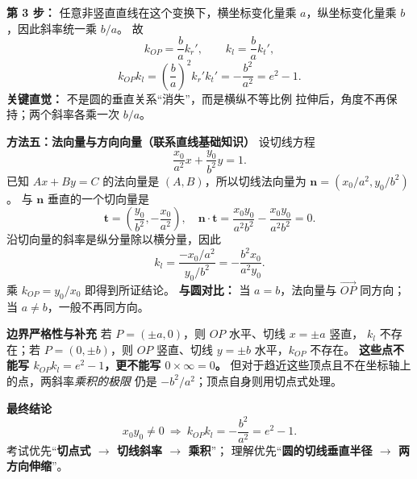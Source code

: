 \begin{proofbox}
\textbf{第 3 步：} 任意非竖直直线在这个变换下，横坐标变化量乘
$a$，纵坐标变化量乘 $b$，因此斜率统一乘 $b/a$。
故
\[
 k_{OP}=\frac ba k_r',\qquad
 k_l=\frac ba k_t',
\]
\[
 \boxed{k_{OP}k_l=\left(\frac ba\right)^2k_r'k_t'
       =-\frac{b^2}{a^2}=e^2-1.}
\]
\textbf{关键直觉：} 不是圆的垂直关系“消失”，而是横纵不等比例
拉伸后，角度不再保持；两个斜率各乘一次 $b/a$。

\medskip
\textbf{\textcolor{CProof}{方法五：法向量与方向向量（联系直线基础知识）}}
设切线方程
\[
      \frac{x_0}{a^2}x+\frac{y_0}{b^2}y=1.
\]
已知 $Ax+By=C$ 的法向量是 $(A,B)$，所以切线法向量为
$\boldsymbol n=(x_0/a^2,y_0/b^2)$。
与 $\boldsymbol n$ 垂直的一个切向量是
\[
 \boldsymbol t=\left(\frac{y_0}{b^2},-\frac{x_0}{a^2}\right),
 \quad
 \boldsymbol n\cdot\boldsymbol t
 =\frac{x_0y_0}{a^2b^2}-\frac{x_0y_0}{a^2b^2}=0.
\]
沿切向量的斜率是纵分量除以横分量，因此
\[
 k_l=\frac{-x_0/a^2}{y_0/b^2}
     =-\frac{b^2x_0}{a^2y_0}.
\]
乘 $k_{OP}=y_0/x_0$ 即得到所证结论。
\textbf{与圆对比：} 当 $a=b$，法向量与 $\overrightarrow{OP}$
同方向；当 $a\ne b$，一般不再同方向。

\medskip
\textbf{\textcolor{CProof}{边界严格性与补充}}
若 $P=(\pm a,0)$，则 $OP$ 水平、切线 $x=\pm a$ 竖直，
$k_l$ 不存在；若 $P=(0,\pm b)$，则 $OP$ 竖直、切线
$y=\pm b$ 水平，$k_{OP}$ 不存在。
\textbf{这些点不能写 $k_{OP}k_l=e^2-1$，更不能写 $0\times\infty=0$。}
但对于趋近这些顶点且不在坐标轴上的点，两斜率\emph{乘积的极限}
仍是 $-b^2/a^2$；顶点自身则用切点式处理。

\medskip
\textbf{\textcolor{CProof}{最终结论}}
\[
 \boxed{\quad x_0y_0\ne0\ \Longrightarrow\
 k_{OP}k_l=-\frac{b^2}{a^2}=e^2-1.\quad}
\]
考试优先“\textbf{切点式 $\to$ 切线斜率 $\to$ 乘积}”；
理解优先“\textbf{圆的切线垂直半径 $\to$ 两方向伸缩}”。
\end{proofbox}
